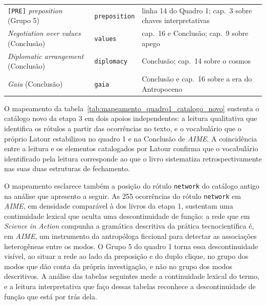 \begin{table}[!htb]
\begin{tabular}{p{3.8cm}p{3.5cm}p{6.3cm}}
\texttt{[PRE]} \emph{preposition} (Grupo 5)    & \texttt{preposition}          & linha 14 do Quadro 1; cap.~3 sobre chaves interpretativas \\
\emph{Negotiation over values} (Conclusão)     & \texttt{values}               & cap.~16 e Conclusão; cap.~9 sobre apego \\
\emph{Diplomatic arrangement} (Conclusão)      & \texttt{diplomacy}            & Conclusão; cap.~14 sobre o cosmos \\
\emph{Gaia} (Conclusão)                        & \texttt{gaia}                 & Conclusão e cap.~16 sobre a era do Antropoceno \\
\bottomrule
\end{tabular}
\end{table}

O mapeamento da tabela~\ref{tab:mapeamento_quadro1_catalogo_novo} sustenta o catálogo novo da etapa  3 em dois apoios independentes: a leitura qualitativa que identifica os rótulos a partir das ocorrências no texto, e o vocabulário que o próprio Latour estabilizou no quadro 1 e na Conclusão de \textit{AIME}. A coincidência entre a leitura e os elementos catalogados por Latour confirma que o vocabulário identificado pela leitura corresponde ao que o livro sistematiza retrospectivamente nas suas duas estruturas de fechamento.

O mapeamento esclarece também a posição do rótulo \texttt{network} do catálogo antigo na análise que apresento a seguir. As 255 ocorrências do rótulo \texttt{network} em \textit{AIME}, em densidade comparável à dos livros da etapa 1, sustentam uma continuidade lexical que oculta uma descontinuidade de função: a rede que em \emph{Science in Action} compunha a gramática descritiva da prática tecnocientífica é, em \textit{AIME}, um instrumento da antropóloga ficcional para detectar as associações heterogêneas entre os modos. O Grupo 5 do quadro 1 torna essa descontinuidade visível, ao situar a rede ao lado da preposição e do duplo clique, no grupo dos modos que dão conta da própria investigação, e não no grupo dos modos descritivos. A análise das tabelas seguintes mede a continuidade lexical do termo, e a leitura interpretativa que faço dessas tabelas reconhece a descontinuidade de função que está por trás dela.

